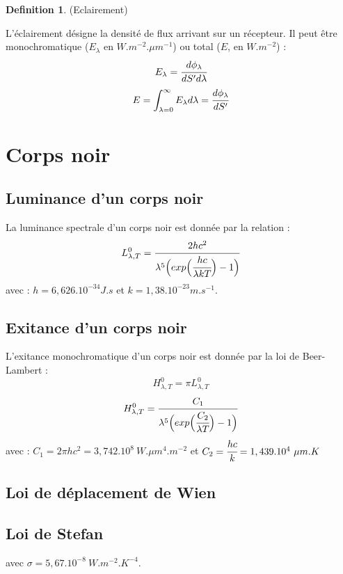 \documentclass[french]{article}
\theoremstyle{definition}
\newtheorem{definition}{Definition}[section]
\begin{document}
\begin{definition}(Eclairement)\par
    L'éclairement désigne la densité de flux arrivant sur un récepteur. Il peut être monochromatique  ($E_{\lambda}$ en $W.m^{-2}.\mu m^{-1}$) ou total ($E$, en $W.m^{-2}$) : 
    $$E_{\lambda} = \cfrac{d\phi_{\lambda}}{dS'd\lambda}$$
    $$E = \int_{\lambda=0}^{\infty}E_{\lambda}d\lambda =\cfrac{d\phi_{\lambda}}{dS'}$$
\end{definition}


\section{Corps noir}
\subsection{Luminance d'un corps noir}
La luminance spectrale d'un corps noir est donnée par la relation :
$$ L_{\lambda, T}^0 = \cfrac{2hc^2}{\lambda^5\Big(exp\Big(\cfrac{hc}{\lambda kT}\Big)-1\Big)}$$
avec : $h=6,626.10^{-34}J.s$ et $k=1,38.10^{-23}m.s^{-1}$.


\subsection{Exitance d'un corps noir}
L'exitance monochromatique d'un corps noir est donnée par la loi de Beer-Lambert :
$$H_{\lambda, T}^0 = \pi L_{\lambda, T}^0$$
$$ H_{\lambda, T}^0 = \cfrac{C_1}{\lambda^5\Big(exp\Big(\cfrac{C_2}{\lambda T}\Big)-1\Big)}$$
avec : $C_1=2\pi hc^2 = 3,742.10^8\ W.\mu m^4.m^{-2}$ et $C_2 = \cfrac{hc}{k}=1,439.10^4\ \mu m.K$

\subsection{Loi de déplacement de Wien}

\begin{center}
\end{center} 

\subsection{Loi de Stefan}

\begin{center}
\end{center}
avec $\sigma = 5,67.10^{-8}\ W.m^{-2}.K^{-4}$.
\end{document}

